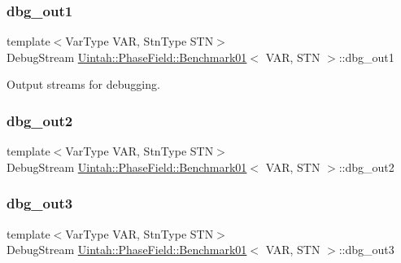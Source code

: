\subsubsection{\texorpdfstring{dbg\+\_\+out1}{dbg\_out1}}
{\footnotesize\ttfamily template$<$Var\+Type V\+AR, Stn\+Type S\+TN$>$ \\
Debug\+Stream \hyperlink{classUintah_1_1PhaseField_1_1Benchmark01}{Uintah\+::\+Phase\+Field\+::\+Benchmark01}$<$ V\+AR, S\+TN $>$\+::dbg\+\_\+out1\hspace{0.3cm}{\ttfamily [protected]}}



Output streams for debugging. 

\mbox{\label{classUintah_1_1PhaseField_1_1Benchmark01_afd6848f35441c7a958306800d00a3750}} 
\subsubsection{\texorpdfstring{dbg\+\_\+out2}{dbg\_out2}}
{\footnotesize\ttfamily template$<$Var\+Type V\+AR, Stn\+Type S\+TN$>$ \\
Debug\+Stream \hyperlink{classUintah_1_1PhaseField_1_1Benchmark01}{Uintah\+::\+Phase\+Field\+::\+Benchmark01}$<$ V\+AR, S\+TN $>$\+::dbg\+\_\+out2\hspace{0.3cm}{\ttfamily [protected]}}

\mbox{\label{classUintah_1_1PhaseField_1_1Benchmark01_a341ce0901f446ac5cd2970c164ae367f}} 
\subsubsection{\texorpdfstring{dbg\+\_\+out3}{dbg\_out3}}
{\footnotesize\ttfamily template$<$Var\+Type V\+AR, Stn\+Type S\+TN$>$ \\
Debug\+Stream \hyperlink{classUintah_1_1PhaseField_1_1Benchmark01}{Uintah\+::\+Phase\+Field\+::\+Benchmark01}$<$ V\+AR, S\+TN $>$\+::dbg\+\_\+out3\hspace{0.3cm}{\ttfamily [protected]}}

